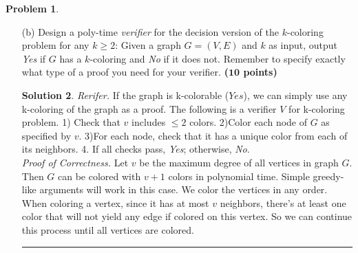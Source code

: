 \documentclass{article}
\theoremstyle{definition}
\newtheorem{problem}{Problem}
\def\fline{\rule{0.75\linewidth}{0.5pt}}
\newcommand{\finishline}{\begin{center}\fline\end{center}}
\newtheorem*{solution*}{Solution}
\newenvironment{solution}{\begin{solution*}}{{\finishline} \end{solution*}}
\newcommand{\grade}[1]{\hfill{\textbf{($\mathbf{#1}$ points)}}}
\begin{document}
\begin{problem}
\begin{itemize}
\begin{solution}
	If the algorithm outputs bipartite, then $G$ is also bipartite.  Consider adding $s$ to $L$, $L_1$ to $R$, $L_2$ to $L$, $L_3$ to $R$, and so on and so forth.  We prove that all edges of $G$ are between the sets $L$ and $R$. Since $L_1$, $L_2$, ...., are computed by BFS, we know that any other edge (u, v) in the graph should be either inside one layer, or from one layer to one after or before it (otherwise, there is a shorter path starting  from $s$ to  one  endpoint  of  the  edge,  a  contradiction).   Moreover,  since  we  checked  in  the algorithm that there is no edge inside one layer, all edges of $G$ are between one layer and the next.Thus, they are all between $L$ and $R$ by the construction above. \\	
	\emph{Runtime Analysis.} Running BFS takes $O(n+m)$ time.  Marking the layer of each set also takes $O(n)$ time and checking the edges require another $O(m)$ time.  So, in total the runtime is $O(n+m)$. \\
		
\end{solution}

		\medskip
		
		\item[(b)] Design a poly-time \emph{verifier} for the decision version of the $k$-coloring problem for any $k \geq 2$: Given a graph $G=(V,E)$ and $k$ as input, output \emph{Yes} if $G$ has a $k$-coloring and \emph{No} if it does not. Remember to specify exactly what type of a proof you need 
		for your verifier. \grade{10}
		
\begin{solution}

	\emph{Rerifer.} If the graph is k-colorable ($Yes$), we can simply use any k-coloring of the graph as a proof. The following is a verifier $V$ for k-coloring problem.  1) Check that $v$ includes $\leq 2$ colors. 2)Color each node of $G$ as specified by $v$. 3)For each node, check that it has a unique color from each of its neighbors. 4. If all checks pass, \emph{Yes}; otherwise, \emph{No}.  \\
	
	\emph{Proof of Correctness.} Let $v$ be the maximum degree of all vertices in graph $G$. Then $G$ can be colored with $v + 1$ colors in polynomial time. Simple greedy-like arguments will work in this case. We color the vertices in any order. When coloring a vertex, since it has at most $v$ neighbors, there’s at least one color that will not yield any edge if colored on this vertex. So we can continue this process until all vertices are colored. \\
	

\end{solution}
\end{itemize}
\end{problem}
\end{document}

